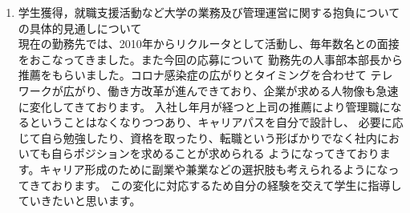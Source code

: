 \documentclass[dvipdfmx]{jlreq}
\begin{document}
\begin{enumerate}
さらに現在の勤務先では、知識発見に改めて取り組むことになりました。過去に行ってきたデータマイニングに基づいてパターンを
抽出する知識発見の研究、近年の説明可能AIの研究から、実務的なデータに技術を適用すると「専門家なら当たり前に知っている
知識しか示すことができない」あるいは「実務の役に立たない些細な知識しか示すことができない」という反省が得られました。
そのため、あらためて人間はどのように知識の発見をしてきたかという問いに立ち戻り、新しい知識の発見を行う技術の研究に
着手しています。観察事象の抽象化による新たな仮説の生成、背景知識と事象の矛盾の発見による新たな仮説の生成などに
取り組み始めています。この研究については、医療、マテリアル、マーケティングなどの応用領域や
説明可能AI、知識の検証の技術に関して国内、海外の複数の研究機関、大学と組んで行っています。
この分野に関しては、採用後も共同研究として引き続き取り組んでいきたいと考えています。
企業で研究を行っているときは、医療、マテリアル、マーケティングなど実利的な応用領域に取り組んでいましたが
大学で採用された場合には、文学、考古学、音楽なども応用領域として加えたいと考えています。
近年博物館、図書館などで芸術などのデータの公開が進んでいますが、必ずしも十分に活用できてはいないと考えます。
知識発見の技術を応用することで、これらの分野における研究を支援することもあるいは、新しい芸術作品を
作り出すことも可能になると考えています。

今回採用された場合、新しく次の研究を立ち上げて、実現することを10年後の目標にしたいと考えています。
産業総合研究所との共同プロジェクトを発展させて、組織経営、マーケティングに関する背景知識から
組織の知識経営を支援する技術の研究です。これには背景知識としてのオントロジーの利用技術に関して様々な論文、著作が
あるスペインUniversidad Politecnica de MadridのOscar Corcho教授の協力を仰ぎたいと考えています。
Corcho教授には、スペインでの精神医療のAIを研究している際に大変有効な助言をいただきました。
近年デジタルトランスフォーメーションという言葉が生まれ、データやAIを利用してより良い経営を
行うことが進められています。しかしながら直接的に経営方針を示唆する有効な技術はいまだ実現できていないと
考えます。組織の運営方針、施策を背景知識や経営データから仮説として生成し、それを実施した場合の数年後の
組織の状態の予測を行い、その予測の根拠を示すことで経営者がより適切な判断ができるようになると考えています。
これは、先に述べた3つの研究が順調に成果を出せれば、その組み合わせにより実現できると考えています。


\item 学生獲得，就職支援活動など大学の業務及び管理運営に関する抱負についての具体的見通しについて\\
現在の勤務先では、2010年からリクルータとして活動し、毎年数名との面接をおこなってきました。また今回の応募について
勤務先の人事部本部長から推薦をもらいました。コロナ感染症の広がりとタイミングを合わせて
テレワークが広がり、働き方改革が進んできており、企業が求める人物像も急速に変化してきております。
入社し年月が経つと上司の推薦により管理職になるということはなくなりつつあり、キャリアパスを自分で設計し、
必要に応じて自ら勉強したり、資格を取ったり、転職という形ばかりでなく社内においても自らポジションを求めることが求められる
ようになってきております。キャリア形成のために副業や兼業などの選択肢も考えられるようになってきております。
この変化に対応するため自分の経験を交えて学生に指導していきたいと思います。


\end{enumerate}
\end{document}

